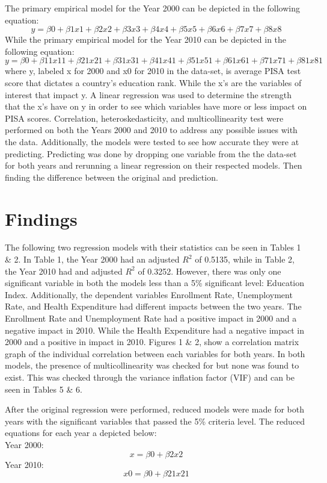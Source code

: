 \documentclass[12pt,english]{article}
\begin{document}
The primary empirical model for  the Year 2000 can be depicted in the following equation:\\
 \[y=\beta0+\beta1x1+\beta2x2+\beta3x3+\beta4x4+\beta5x5+\beta6x6+\beta7x7+\beta8x8\]
While the primary empirical model for the Year 2010 can be depicted in the following equation:\\
\[y=\beta0+\beta11x11+\beta21x21+\beta31x31+\beta41x41+\beta51x51+\beta61x61+\beta71x71+\beta81x81\]
where y, labeled x for 2000 and x0 for 2010 in the data-set, is average PISA test score that dictates a country’s education rank. While the x’s are the variables of interest that impact y. A linear regression was used to determine the strength that the x’s have on y in order to see which variables have more or less impact on PISA scores.
Correlation, heteroskedasticity, and multicollinearity test were performed on both the Years 2000 and 2010 to address any possible issues with the data. Additionally, the models were tested to see how accurate they were at predicting. Predicting was done by dropping one variable from the the data-set for both years and rerunning a linear regression on their respected models. Then finding the difference between the original and prediction.  


\section{Findings}
The following two regression models with their statistics can be seen in Tables 1 \& 2. In Table 1, the Year 2000 had an adjusted $R^2$ of 0.5135, while in Table 2, the Year 2010 had and adjusted $R^2$ of 0.3252. However, there was only one significant variable in both the models less than a 5\% significant level: Education Index. Additionally, the dependent variables Enrollment Rate, Unemployment Rate, and Health Expenditure had different impacts between the two years. The Enrollment Rate and Unemployment Rate had a positive impact in 2000 and a negative impact in 2010. While the Health Expenditure had a negative impact in 2000 and a positive in impact in 2010. Figures 1 \& 2, show a correlation matrix graph of the individual correlation between each variables for both years.  In both models, the presence of multicollinearity was checked for but none was found to exist. This was checked through the variance inflation factor (VIF) and  can be seen in Tables 5 \& 6.

After the original regression were performed, reduced models were made for both years with the significant variables that passed the 5\% criteria level. The reduced equations for each year a depicted below:\\
                      Year 2000:
\[x=\beta0+\beta2x2\]
				     Year 2010:
\[x0=\beta0+\beta21x21\]
\end{document}
